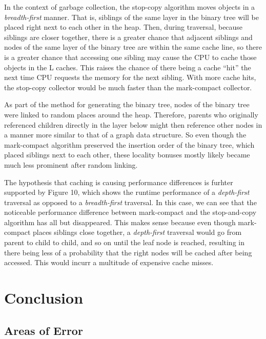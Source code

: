 \documentclass[index]{subfiles}
\begin{document}
In the context of garbage collection, the stop-copy algorithm moves objects in a \textit{breadth-first} manner. That is, siblings of the same layer in the binary tree will be placed right next to each other in the heap. Then, during traversal, because siblings are closer together, there is a greater chance that adjacent siblings and nodes of the same layer of the binary tree are within the same cache line, so there is a greater chance that accessing one sibling may cause the CPU to cache those objects in the L caches. This raises the chance of there being a cache ``hit'' the next time CPU requests the memory for the next sibling. With more cache hits, the stop-copy collector would be much faster than the mark-compact collector. %

As part of the method for generating the binary tree, nodes of the binary tree were linked to random places around the heap. Therefore, parents who originally referenced children directly in the layer below might then reference other nodes in a manner more similar to that of a graph data structure. So even though the mark-compact algorithm preserved the insertion order of the binary tree, which placed siblings next to each other, these locality bonuses mostly likely became much less prominent after random linking.

The hypothesis that caching is causing performance differences is furhter supported by Figure 10, which shows the runtime performance of a \textit{depth-first} traversal as opposed to a \textit{breadth-first} traversal. In this case, we can see that the noticeable performance difference between mark-compact and the stop-and-copy algorithm has all but disappeared. This makes sense because even though mark-compact places siblings close together, a \textit{depth-first} traversal would go from parent to child to child, and so on until the leaf node is reached, resulting in there being less of a probability that the right nodes will be cached after being accessed. This would incurr a multitude of expensive cache misses.

\section{Conclusion}

\subsection{Areas of Error}
\end{document}
